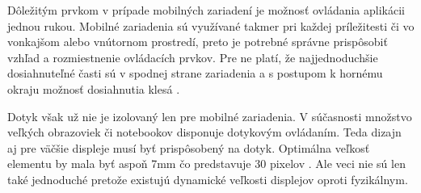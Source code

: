 Dôležitým prvkom v prípade mobilných zariadení je možnosť ovládania aplikácii jednou rukou. Mobilné zariadenia sú využívané takmer pri každej príležitesti či vo vonkajšom alebo vnútornom prostredí, preto je potrebné správne prispôsobiť vzhľad a rozmiestnenie ovládacích prvkov. Pre ne platí, že najjednoduchšie dosiahnuteľné časti sú v spodnej strane zariadenia a s postupom k hornému okraju možnosť dosiahnutia klesá \cite{mobilebooktouch}.

Dotyk však už nie je izolovaný len pre mobilné zariadenia. V súčasnosti množstvo veľkých obrazoviek či notebookov disponuje dotykovým ovládaním. Teda dizajn aj pre väčšie displeje musí byť prispôsobený na dotyk. Optimálna veľkosť elementu by mala byť aspoň 7mm čo predstavuje 30 pixelov \cite{designingfortouch}. Ale veci nie sú len také jednoduché pretože existujú dynamické veľkosti displejov oproti fyzikálnym.


